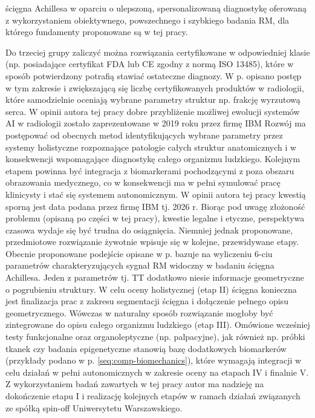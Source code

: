 ścięgna Achillesa w oparciu o ulepszoną, spersonalizowaną diagnostykę oferowaną z wykorzystaniem obiektywnego, powszechnego i szybkiego badania RM, dla którego fundamenty proponowane są w tej pracy. 

Do trzeciej grupy zaliczyć można rozwiązania certyfikowane w odpowiedniej klasie (np. posiadające certyfikat FDA lub CE zgodny z normą ISO 13485), które \linebreak w sposób potwierdzony potrafią stawiać ostateczne diagnozy. W p. opisano postęp w tym zakresie i zwiększającą się liczbę certyfikowanych produktów w radiologii, które samodzielnie oceniają wybrane parametry struktur np. frakcję wyrzutową serca. W opinii autora tej pracy dobre przybliżenie możliwej ewolucji systemów AI \linebreak w radiologii zostało zaprezentowane w 2019 roku przez firmę IBM 
Rozwój ma postępować od obecnych metod identyfikujących wybrane parametry przez systemy holistyczne rozpoznające patologie całych struktur anatomicznych \linebreak i w konsekwencji wspomagające diagnostykę całego organizmu ludzkiego. Kolejnym etapem powinna być integracja z biomarkerami pochodzącymi z poza obszaru obrazowania medycznego, co w konsekwencji ma w pełni symulować pracę klinicysty i stać się systemem autonomicznym. W opinii autora tej pracy kwestią sporną jest data podana przez firmę IBM tj. 2026 r. Biorąc pod uwagę złożoność problemu (opisaną po części w tej pracy), kwestie legalne i etyczne, perspektywa czasowa wydaje się być trudna do osiągnięcia. Niemniej jednak proponowane, przedmiotowe rozwiązanie żywotnie wpisuje się w kolejne, przewidywane etapy. Obecnie proponowane podejście opisane w p.  bazuje na wyliczeniu 6-ciu parametrów charakteryzujących sygnał RM widoczny w badaniu ścięgna Achillesa. Jeden z parametrów tj. TT dodatkowo niesie informacje geometryczne o pogrubieniu struktury. W celu oceny holistycznej (etap II) ścięgna konieczna jest finalizacja prac z zakresu segmentacji ścięgna i dołączenie pełnego opisu geometrycznego. Wówczas w naturalny sposób rozwiązanie mogłoby być zintegrowane do opisu całego organizmu ludzkiego (etap III). Omówione wcześniej testy funkcjonalne oraz organoleptyczne (np. palpacyjne), jak również np. próbki tkanek czy badania epigenetyczne stanowią bazę dodatkowych biomarkerów (przykłady podano w p. \ref{seq:comp-biomechanics}), które wymagają integracji w celu działań w pełni autonomicznych w zakresie oceny na etapach IV i finalnie V. Z wykorzystaniem badań zawartych w tej pracy autor ma nadzieję na dokończenie etapu I i realizację kolejnych etapów w ramach działań związanych ze spółką spin-off Uniwersytetu Warszawskiego.
